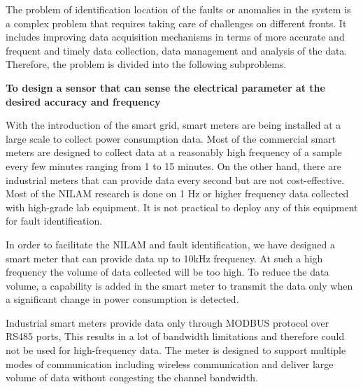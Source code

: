 The problem of identification location of the faults or anomalies in the system is a complex problem that requires taking care of challenges on different fronts. It includes improving data acquisition mechanisms in terms of more accurate and frequent and timely data collection, data management and analysis of the data. Therefore, the problem is divided into the following subproblems.

\textbf{To design a sensor that can sense the electrical parameter at the desired accuracy and frequency}

With the introduction of the smart grid, smart meters are being installed at a large scale to collect power consumption data. Most of the commercial smart meters are designed to collect data at a reasonably high frequency of a sample every few minutes ranging from 1 to 15 minutes. On the other hand, there are industrial meters that can provide data every second but are not cost-effective. Most of the NILAM research is done on 1 Hz or higher frequency data collected with high-grade lab equipment. It is not practical to deploy any of this equipment for fault identification.
 
In order to facilitate the NILAM and fault identification, we have designed a smart meter that can provide data up to 10kHz frequency. At such a high frequency the volume of data collected will be too high. To reduce the data volume, a capability is added in the smart meter to transmit the data only when a significant change in power consumption is detected. 

Industrial smart meters provide data only through MODBUS protocol over RS485 ports, This results in a lot of bandwidth limitations and therefore could not be used for high-frequency data. The meter is designed to support multiple modes of communication including wireless communication and deliver large volume of data without congesting the channel bandwidth.  


